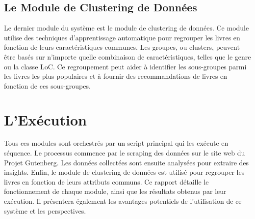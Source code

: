 \subsection{Le Module de Clustering de Données}
Le dernier module du système est le module de clustering de données. Ce module utilise des techniques d'apprentissage automatique pour regrouper les livres en fonction de leurs caractéristiques communes. Les groupes, ou clusters, peuvent être basés sur n'importe quelle combinaison de caractéristiques, telles que le genre ou la classe LoC. Ce regroupement peut aider à identifier les sous-groupes parmi les livres les plus populaires et à fournir des recommandations de livres en fonction de ces sous-groupes.

\section{L'Exécution}
Tous ces modules sont orchestrés par un script principal qui les exécute en séquence. Le processus commence par le scraping des données sur le site web du Projet Gutenberg. Les données collectées sont ensuite analysées pour extraire des insights. Enfin, le module de clustering de données est utilisé pour regrouper les livres en fonction de leurs attributs communs. Ce rapport détaille le fonctionnement de chaque module, ainsi que les résultats obtenus par leur exécution. Il présentera également les avantages potentiels de l'utilisation de ce système et les perspectives.
